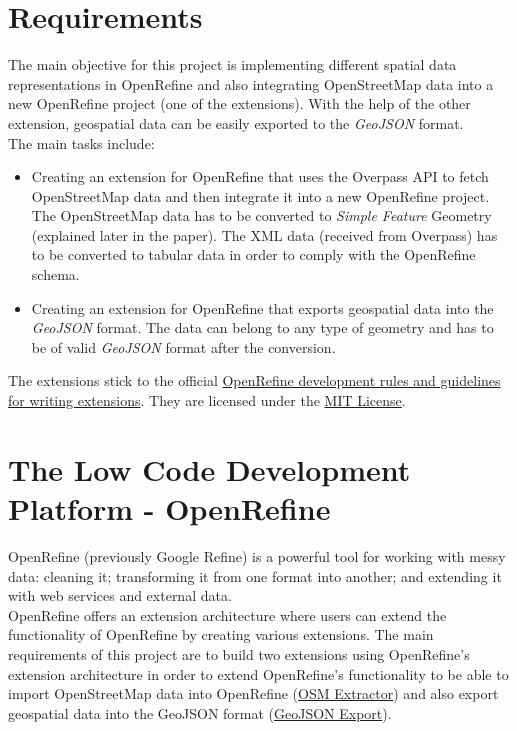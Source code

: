 \section{Requirements}
The main objective for this project is implementing different spatial data representations in OpenRefine and also integrating OpenStreetMap data into
a new OpenRefine project (one of the extensions). With the help of the other extension, geospatial data can be easily exported to the \textit{GeoJSON} format.\\
\newline
The main tasks include:
\begin{itemize}
   \item Creating an extension for OpenRefine that uses the Overpass API to fetch OpenStreetMap data and then integrate it into a new OpenRefine project.
    \subitem The OpenStreetMap data has to be converted to \textit{Simple Feature} Geometry (explained later in the paper).
    \subitem The XML data (received from Overpass) has to be converted to tabular data in order to comply with the OpenRefine schema.
   \item Creating an extension for OpenRefine that exports geospatial data into the \textit{GeoJSON} format.
    \subitem  The data can belong to any type of geometry and has to be of valid \textit{GeoJSON} format after the conversion.
\end{itemize}
The extensions stick to the official \href{https://docs.openrefine.org/technical-reference/writing-extensions}{OpenRefine development rules and guidelines for writing extensions}. They are licensed
under the \href{https://opensource.org/licenses/MIT}{MIT License}.
\newpage
\section{The Low Code Development Platform - OpenRefine}
OpenRefine (previously Google Refine) is a powerful tool for working with messy data: cleaning it; transforming it from one format into another; and extending it with web services and external data. \cite{AboutOpenRefine}\\
\newline
OpenRefine offers an extension architecture where users can extend the functionality of OpenRefine by creating various extensions.
The main requirements of this project are to build two extensions using OpenRefine's extension architecture in order to extend OpenRefine's functionality to
be able to import OpenStreetMap data into OpenRefine (\hyperref[ch:the-osm-extractor-extension]{OSM Extractor}) and also export geospatial
data into the GeoJSON format (\hyperref[ch:the-geojson-export-extension]{GeoJSON Export}).

